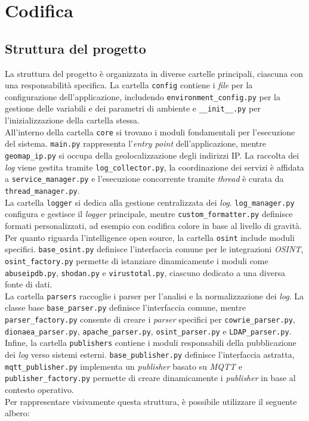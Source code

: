 \section{Codifica}
\subsection{Struttura del progetto}
\normalsize
La struttura del progetto è organizzata in diverse cartelle principali, ciascuna con una responsabilità specifica. La cartella \texttt{config} contiene i \textit{file} per la configurazione dell'applicazione, includendo \texttt{environment\_config.py} per la gestione delle variabili e dei parametri di ambiente e \texttt{\_\_init\_\_.py} per l'inizializzazione della cartella stessa.\\
All'interno della cartella \texttt{core} si trovano i moduli fondamentali per l'esecuzione del sistema. \texttt{main.py} rappresenta l'\textit{entry point} dell'applicazione, mentre \texttt{geomap\_ip.py} si occupa della geolocalizzazione degli indirizzi IP. La raccolta dei \textit{log} viene gestita tramite \texttt{log\_collector.py}, la coordinazione dei servizi è affidata a \texttt{service\_manager.py} e l'esecuzione concorrente tramite \textit{thread} è curata da \texttt{thread\_manager.py}.\\
La cartella \texttt{logger} si dedica alla gestione centralizzata dei \textit{log}. \texttt{log\_manager.py} configura e gestisce il \textit{logger} principale, mentre \texttt{custom\_formatter.py} definisce formati personalizzati, ad esempio con codifica colore in base al livello di gravità.\\
Per quanto riguarda l'intelligence open source, la cartella \texttt{osint} include moduli specifici. \texttt{base\_osint.py} definisce l'interfaccia comune per le integrazioni \textit{OSINT}, \texttt{osint\_factory.py} permette di istanziare dinamicamente i moduli come \texttt{abuseipdb.py}, \texttt{shodan.py} e \texttt{virustotal.py}, ciascuno dedicato a una diversa fonte di dati.\\
La cartella \texttt{parsers} raccoglie i parser per l'analisi e la normalizzazione dei \textit{log}. La classe base \texttt{base\_parser.py} definisce l'interfaccia comune, mentre \texttt{parser\_factory.py} consente di creare i \textit{parser} specifici per \texttt{cowrie\_parser.py}, \texttt{dionaea\_parser.py}, \texttt{apache\_parser.py}, \texttt{osint\_parser.py} e \texttt{LDAP\_parser.py}.\\
Infine, la cartella \texttt{publishers} contiene i moduli responsabili della pubblicazione dei \textit{log} verso sistemi esterni. \texttt{base\_publisher.py} definisce l'interfaccia astratta, \texttt{mqtt\_publisher.py} implementa un \textit{publisher} basato su \textit{MQTT} e \texttt{publisher\_factory.py} permette di creare dinamicamente i \textit{publisher} in base al contesto operativo.\\
Per rappresentare visivamente questa struttura, è possibile utilizzare il seguente albero:\\

